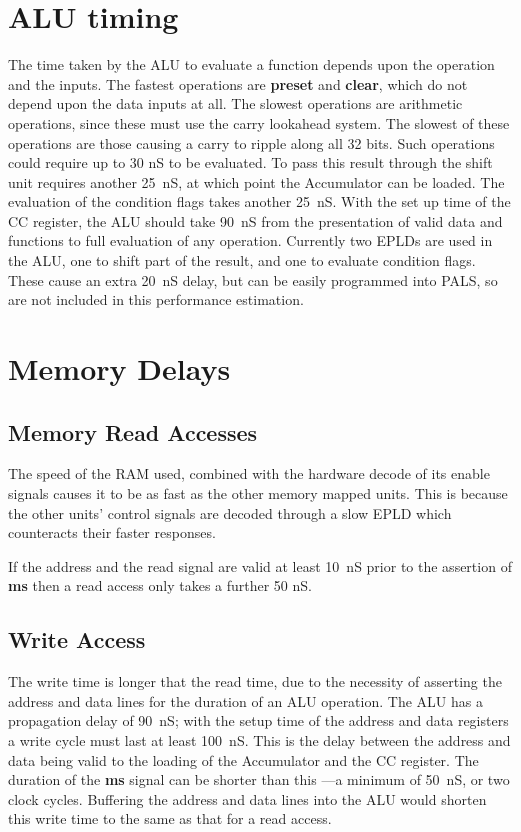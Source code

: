 \section{ALU timing}
The time taken by the ALU to evaluate a function depends upon the operation and the inputs.
The fastest operations are {\bf preset} and {\bf clear}, which do not depend upon the data inputs at all.
The slowest operations are arithmetic operations, since these must use the carry lookahead system.
The slowest of these operations are those causing a carry to ripple along all 32 bits. 
Such operations could require up to 30 nS to be evaluated.
To pass this result through the shift unit requires another 25~nS, at which
point the Accumulator can be loaded.
The evaluation of the condition flags  takes another 25~nS.
With the set up time of the CC register, the ALU should take 90~nS from the presentation of valid data and functions to  full evaluation of any operation.
Currently two EPLDs are used in the ALU, one to shift  part of the result, and one to evaluate condition flags. These cause an extra 20~nS delay, but can be easily programmed into PALS, so are not included in this performance estimation.


\section{Memory Delays}

\subsection{Memory Read Accesses}
The speed of the RAM used, combined with the hardware decode of its enable signals  causes it to be as fast as the other memory mapped units.
This is because the other units' control signals are decoded through a slow EPLD which counteracts their faster responses.

If the address and the read signal are valid at least 10~nS prior to the assertion of {\bf ms} then a read access only takes a further 50 nS.


\subsection{Write Access}
The write time is longer that the read time, due to the necessity of asserting the address and data lines for the  duration of an ALU operation.
The ALU has a propagation delay of 90~nS; with the setup time of the address and data registers a write cycle must last at least 100~nS.
This is the delay between the address and data being valid to the loading of the Accumulator and the CC register.
The duration of the {\bf ms} signal can be shorter than this ---a minimum  of 50~nS, or two clock cycles.
Buffering the address and data lines into the ALU would shorten this write time to the same as that for a read access.

